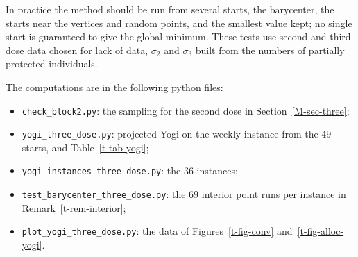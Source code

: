 \documentclass[11pt]{article}
\theoremstyle{plain}
\theoremstyle{remark}
\numberwithin{equation}{section}
\begin{document}
%

In practice the method should be run from several starts, the barycenter, the
starts near the vertices and random points, and the smallest value kept; no
single start is guaranteed to give the global minimum. These tests use second
and third dose data chosen for lack of data, $\sigma_2$ and $\sigma_3$ built
from the numbers of partially protected individuals.

The computations are in the following python files:
\begin{itemize}
\item \texttt{check\_block2.py}: the sampling for the second dose in
Section~\ref{M-sec-three};
\item \texttt{yogi\_three\_dose.py}: projected Yogi on the weekly
instance from the $49$ starts, and Table~\ref{t-tab-yogi};
\item \texttt{yogi\_instances\_three\_dose.py}: the $36$ instances;
\item \texttt{test\_barycenter\_three\_dose.py}: the $69$ interior point runs
per instance in Remark~\ref{t-rem-interior};
\item \texttt{plot\_yogi\_three\_dose.py}: the data of
Figures~\ref{t-fig-conv} and~\ref{t-fig-alloc-yogi}.
\end{itemize}



\end{document}
